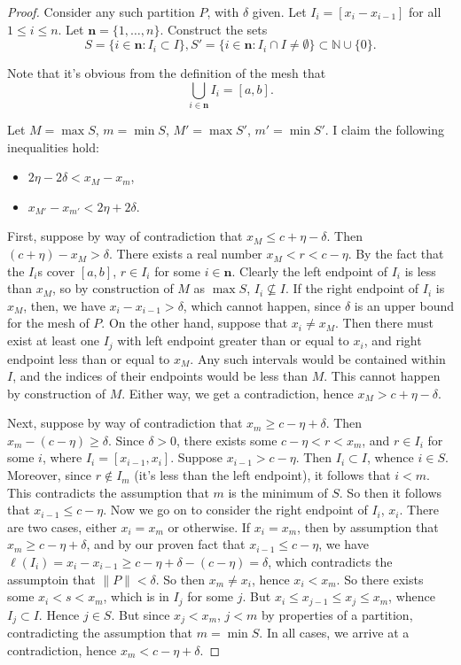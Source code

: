 \documentclass[12pt, letterpaper]{article}
\newcommand{\N}{\mathbb{N}}
\newcommand\norm[1]{\lVert#1\rVert} %
\theoremstyle{definition}
\begin{document}
    \begin{proof}
        Consider any such partition $P$, with $\delta$ given. Let $I_i = [x_i - x_{i - 1}]$ for all $1\le i\le n$. Let $\mathbf{n} = \{1,\dots, n\}$. Construct the sets
        \[ S = \{i\in \mathbf{n} : I_i\subset I\}, S' = \{i\in \mathbf{n}: I_i\cap I \ne \emptyset\}\subset \N\cup \{0\}.
            \]

        Note that it's obvious from the definition of the mesh that 
        \[
            \bigcup_{i \in \mathbf{n}}I_i = [a,b].
            \]

        Let $M = \max S$, $m = \min S$, $M' = \max S'$, $m' = \min S'$. I claim the following inequalities hold:
        \begin{itemize}
            \item $2\eta - 2\delta < x_M - x_m$,
            \item $x_{M'} - x_{m'} < 2\eta + 2\delta$.
        \end{itemize}

        First, suppose by way of contradiction that $ x_M \le c + \eta - \delta $. Then $(c+ \eta) - x_M > \delta$. There exists a real number $ x_M < r< c - \eta$. By the fact that the $I_i$s cover $[a,b]$, $r\in I_i$ for some $i\in \mathbf{n}$. Clearly the left endpoint of $I_i$ is less than $x_M$, so by construction of $M$ as $\max S$, $I_i\not\subseteq I$. If the right endpoint of $I_i$ is $x_M$, then, we have $x_i - x_{i - 1} > \delta$, which cannot happen, since $\delta$ is an upper bound for the mesh of $P$. On the other hand, suppose that $x_i\ne x_M$. Then there must exist at least one $I_j$ with left endpoint greater than or equal to $x_i$, and right endpoint less than or equal to $x_M$. Any such intervals would be contained within $I$, and the indices of their endpoints would be less than $M$. This cannot happen by construction of $M$. Either way, we get a contradiction, hence $x_M > c + \eta - \delta$.

        Next, suppose by way of contradiction that $ x_m \ge c - \eta + \delta $. Then $ x_m - (c - \eta) \ge \delta $. Since $\delta > 0$, there exists some $c- \eta<r<x_m$, and $r\in I_i$ for some $i$, where $I_i = [x_{i-1}, x_i]$. Suppose $x_{i-1} > c - \eta$. Then $I_i\subset I$, whence $i\in S$. Moreover, since $r\not\in I_m$ (it's less than the left endpoint), it follows that $i < m$. This contradicts the assumption that $m$ is the minimum of $S$. So then it follows that $ x_{i-1} \le c - \eta $. Now we go on to consider the right endpoint of $I_i$, $x_i$. There are two cases, either $x_i = x_m$ or otherwise. If $x_i = x_m$, then by assumption that $x_m\ge c - \eta + \delta$, and by our proven fact that $x_{i-1} \le c - \eta$, we have $ \ell(I_i) = x_i - x_{i - 1} \ge c - \eta + \delta - (c - \eta) = \delta$, which contradicts the assumptoin that $\norm{P} < \delta$. So then $x_m\ne x_i$, hence $x_i < x_m$. So there exists some $x_i< s<x_m$, which is in $I_j$ for some $j$. But $x_i\le x_{j-1}\le x_j \le x_m$, whence $I_j\subset I$. Hence $j\in S$. But since $x_j < x_m$, $j < m$ by properties of a partition, contradicting the assumption that $m  = \min S$. In all cases, we arrive at a contradiction, hence $ x_m < c - \eta + \delta $. 
        

\end{proof}
\end{document}
